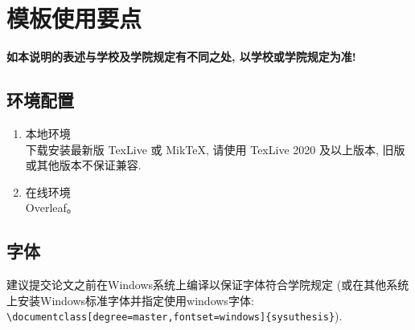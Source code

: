
\chapter{模板使用要点}

\textbf{如本说明的表述与学校及学院规定有不同之处, 以学校或学院规定为准!} 

\section{环境配置}
\begin{enumerate}
    \item 本地环境\\
    下载安装最新版 TexLive 或 MikTeX, 请使用 TexLive 2020 及以上版本, 旧版或其他版本不保证兼容.
    \item 在线环境\\
    Overleaf。
\end{enumerate}

\section{字体}
建议提交论文之前在Windows系统上编译以保证字体符合学院规定 (或在其他系统上安装Windows标准字体并指定使用windows字体: \verb|\documentclass[degree=master,fontset=windows]{sysuthesis}|).

